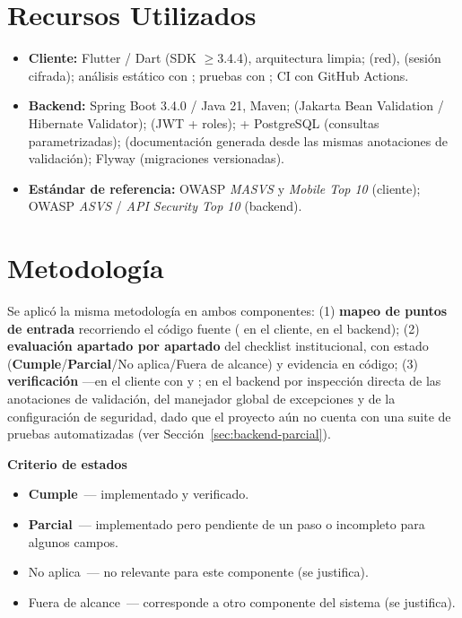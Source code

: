 \documentclass[11pt,a4paper]{article}
\newcommand{\Cumple}{\textcolor{cumpleColor}{\textbf{Cumple}}}
\newcommand{\Parcial}{\textcolor{parcialColor}{\textbf{Parcial}}}
\newcommand{\NoAplica}{\textcolor{noaplicaColor}{No aplica}}
\newcommand{\Fuera}{\textcolor{fueraColor}{Fuera de alcance}}
\begin{document}
\section{Recursos Utilizados}

\begin{itemize}[leftmargin=1.5cm]
    \item \textbf{Cliente:} Flutter / Dart (SDK $\geq$3.4.4), arquitectura limpia; \texttt{} (red), \texttt{} (sesión cifrada); análisis estático con \texttt{}; pruebas con \texttt{}; CI con GitHub Actions.
    \item \textbf{Backend:} Spring Boot 3.4.0 / Java 21, Maven; \texttt{} (Jakarta Bean Validation / Hibernate Validator); \texttt{} (JWT + roles); \texttt{} + PostgreSQL (consultas parametrizadas); \texttt{} (documentación generada desde las mismas anotaciones de validación); Flyway (migraciones versionadas).
    \item \textbf{Estándar de referencia:} OWASP \emph{MASVS} y \emph{Mobile Top 10} (cliente); OWASP \emph{ASVS} / \emph{API Security Top 10} (backend).
\end{itemize}

\section{Metodología}

Se aplicó la misma metodología en ambos componentes: (1) \textbf{mapeo de puntos de entrada} recorriendo el código fuente (\texttt{} en el cliente, \texttt{} en el backend); (2) \textbf{evaluación apartado por apartado} del checklist institucional, con estado (\Cumple/\Parcial/\NoAplica/\Fuera) y evidencia en código; (3) \textbf{verificación} —en el cliente con \texttt{} y \texttt{}; en el backend por inspección directa de las anotaciones de validación, del manejador global de excepciones y de la configuración de seguridad, dado que el proyecto aún no cuenta con una suite de pruebas automatizadas (ver Sección~\ref{sec:backend-parcial}).

\textbf{Criterio de estados}
\begin{itemize}[leftmargin=1.5cm]
    \item \Cumple\ --- implementado y verificado.
    \item \Parcial\ --- implementado pero pendiente de un paso o incompleto para algunos campos.
    \item \NoAplica\ --- no relevante para este componente (se justifica).
    \item \Fuera\ --- corresponde a otro componente del sistema (se justifica).
\end{itemize}
\end{document}
